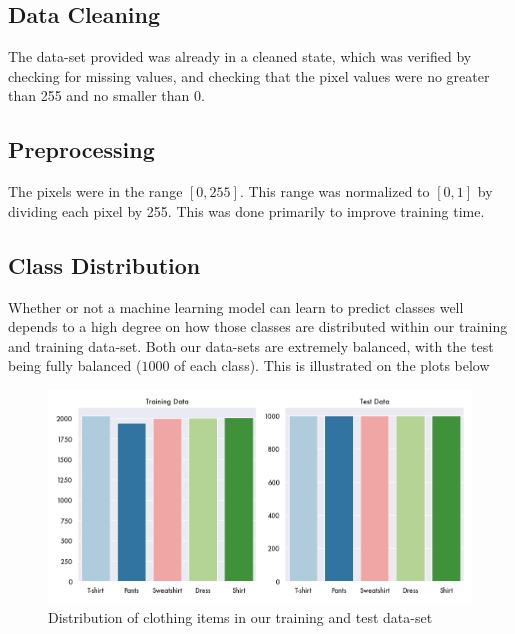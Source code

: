 \subsection{Data Cleaning}
The data-set provided was already in a cleaned state, which was verified by checking for missing values, and checking that the pixel values were no greater than 255 and no smaller than 0. 

\subsection{Preprocessing}
The pixels were in the range $[0, 255]$. This range was normalized to $[0, 1]$ by dividing each pixel by 255. This was done primarily to improve training time. %

\subsection{Class Distribution}
Whether or not a machine learning model can learn to predict classes well depends to a high degree on how those classes are distributed within our training and training data-set. Both our data-sets are extremely balanced, with the test being fully balanced ($1000$ of each class). This is illustrated on the plots below

\begin{figure}[ht]
\centering
\includegraphics[scale=0.45]{figures_for_report/class_distribution}
\captionsetup{justification=centering,margin=2cm}
\caption{Distribution of clothing items in our training and test data-set}
\end{figure}

